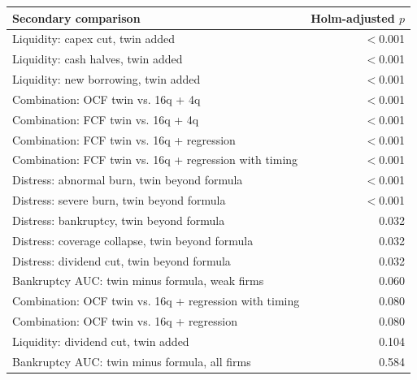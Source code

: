 \begin{tabular}{lr}
\toprule
Secondary comparison & Holm-adjusted $p$ \\
\midrule
Liquidity: capex cut, twin added & $<$0.001 \\
Liquidity: cash halves, twin added & $<$0.001 \\
Liquidity: new borrowing, twin added & $<$0.001 \\
Combination: OCF twin vs. 16q + 4q & $<$0.001 \\
Combination: FCF twin vs. 16q + 4q & $<$0.001 \\
Combination: FCF twin vs. 16q + regression & $<$0.001 \\
Combination: FCF twin vs. 16q + regression with timing & $<$0.001 \\
Distress: abnormal burn, twin beyond formula & $<$0.001 \\
Distress: severe burn, twin beyond formula & $<$0.001 \\
Distress: bankruptcy, twin beyond formula & 0.032 \\
Distress: coverage collapse, twin beyond formula & 0.032 \\
Distress: dividend cut, twin beyond formula & 0.032 \\
Bankruptcy AUC: twin minus formula, weak firms & 0.060 \\
Combination: OCF twin vs. 16q + regression with timing & 0.080 \\
Combination: OCF twin vs. 16q + regression & 0.080 \\
Liquidity: dividend cut, twin added & 0.104 \\
Bankruptcy AUC: twin minus formula, all firms & 0.584 \\
\bottomrule
\end{tabular}
